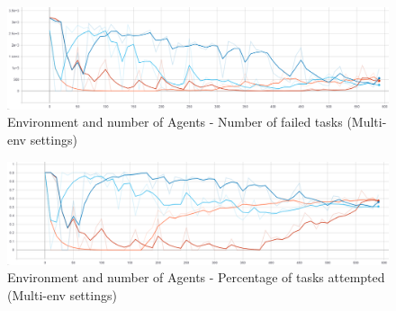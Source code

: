 \begin{figure}[H]
    \centering
    \includegraphics[width=\linewidth]{figures/5_evaluation_figs/env_agent_num_training_fig/num_failed_tasks.png}
    \caption{Environment and number of Agents - Number of failed tasks (Multi-env settings)}
    \label{fig:env-num-failed-tasks}
\end{figure}

\begin{figure}[H]
    \centering
    \includegraphics[width=\linewidth]{figures/5_evaluation_figs/env_agent_num_training_fig/percent_tasks.png}
    \caption{Environment and number of Agents - Percentage of tasks attempted (Multi-env settings)}
    \label{fig:env-percent-tasks}
\end{figure}

